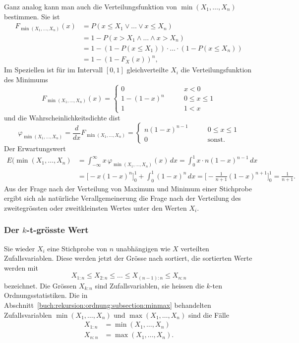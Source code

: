 Ganz analog kann man auch die Verteilungsfunktion von
$\operatorname{min}(X_1,\dots,X_n)$ bestimmen.
Sie ist
\begin{align*}
F_{\operatorname{min}(X_1,\dots,X_n)}(x)
&=
P(x\le X_1\vee \dots \vee x\le X_n)
\\
&=
1-
P(x > X_1\wedge \dots \wedge x > X_n)
\\
&=
1-
(1-P(x\le X_1)) \cdot\ldots\cdot (1-P(x\le X_n))
\\
&=
1-(1-F_X(x))^n,
\end{align*}
Im Speziellen ist für im Intervall $[0,1]$ gleichverteilte $X_i$ die
Verteilungsfunktion des Minimums
\[
F_{\operatorname{min}(X_1,\dots,X_n)}(x)
=
\begin{cases}
0        &\qquad x<0        \\
1-(1-x)^n&\qquad 0\le x\le 1\\
1        &\qquad 1 < x
\end{cases}
\]
und die Wahrscheinlichkeitsdichte dist
\[
\varphi_{\operatorname{min}(X_1,\dots,X_n)}
=
\frac{d}{dx}
F_{\operatorname{min}(X_1,\dots,X_n)}
=
\begin{cases}
n(1-x)^{n-1}&\qquad 0\le x\le 1\\
0           &\qquad \text{sonst.}
\end{cases}
\]
Der Erwartungswert
\begin{align*}
E(\operatorname{min}(X_1,\dots,X_n)
&=
\int_{-\infty}^\infty x\,\varphi_{\operatorname{min}(X_1,\dots,X_n)}(x)\,dx
=
\int_0^1 x\cdot n(1-x)^{n-1}\,dx
\\
&=
\bigl[ -x(1-x)^n \bigr]_0^1 + \int_0^1 (1-x)^n\,dx
=
\biggl[
-
\frac{1}{n+1}
(1-x)^{n+1}
\biggr]_0^1
=
\frac{1}{n+1}.
\end{align*}
Aus der Frage nach der Verteilung von Maximum und Minimum einer
Stichprobe 
ergibt sich als natürliche Verallgemeinerung die Frage nach
der Verteilung des zweitegrössten oder zweitkleinsten Wertes unter den
Werten $X_i$.

\subsubsection{Der $k$-t-grösste Wert}
Sie wieder $X_i$ eine Stichprobe von $n$ unabhängigen wie $X$ verteilten
Zufallsvariablen.
Diese werden jetzt der Grösse nach sortiert, die sortierten Werte werden
mit
\[
X_{1:n} \le X_{2:n} \le \dots \le X_{(n-1):n} \le X_{n:n}
\]
bezeichnet.
Die Grössen $X_{k:n}$ sind Zufallsvariablen, sie heissen die $k$-ten
Ordnungsstatistiken.
Die in Abschnitt~\ref{buch:rekursion:ordnung:subsection:minmax} behandelten Zufallsvariablen
$\operatorname{min}(X_1,\dots,X_n)$
und
$\operatorname{max}(X_1,\dots,X_n)$
sind die Fälle
\begin{align*}
X_{1:n} &= \operatorname{min}(X_1,\dots,X_n) \\
X_{n:n} &= \operatorname{max}(X_1,\dots,X_n).
\end{align*}

